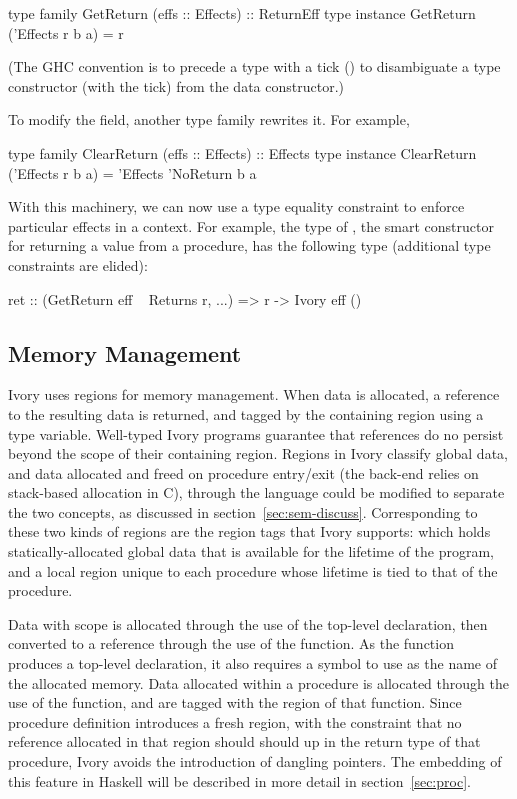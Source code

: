 \begin{code}
type family   GetReturn (effs :: Effects) :: ReturnEff
type instance GetReturn ('Effects r b a) = r
\end{code}

\noindent
(The GHC convention is to precede a type with a tick () to disambiguate a
type constructor (with the tick) from the data constructor.)

To modify the field, another type family rewrites it. For example,

\begin{code}
type family   ClearReturn (effs :: Effects) :: Effects
type instance ClearReturn ('Effects r b a) =
  'Effects 'NoReturn b a
\end{code}

With this machinery, we can now use a type equality constraint to enforce
particular effects in a context. For example, the type of , the smart
constructor for returning a value from a procedure, has the following type
(additional type constraints are elided):

\begin{code}
ret :: (GetReturn eff ~ Returns r, ...)
    => r -> Ivory eff ()
\end{code}

\subsection{Memory Management}
\label{sec:ref}

Ivory uses regions for memory management.  When data is allocated, a reference
to the resulting data is returned, and tagged by the containing region using a
type variable.  Well-typed Ivory programs guarantee that references do no
persist beyond the scope of their containing region.  Regions in Ivory classify
global data, and data allocated and freed on procedure entry/exit (the back-end
relies on stack-based allocation in C), through the language could be modified
to separate the two concepts, as discussed in section~\ref{sec:sem-discuss}.
Corresponding to these two kinds of regions are the region tags that Ivory
supports:  which holds statically-allocated global data that is
available for the lifetime of the program, and a local region unique to each
procedure whose lifetime is tied to that of the procedure.

Data with  scope is allocated through the use of the 
top-level declaration, then converted to a reference through the use of the
 function.  As the  function produces a top-level
declaration, it also requires a symbol to use as the name of the allocated
memory.  Data allocated within a procedure is allocated through the use of the
 function, and are tagged with the region of that function.  Since
procedure definition introduces a fresh region, with the constraint that no
reference allocated in that region should should up in the return type of that
procedure, Ivory avoids the introduction of dangling pointers.  The embedding of
this feature in Haskell will be described in more detail in
section~\ref{sec:proc}.

